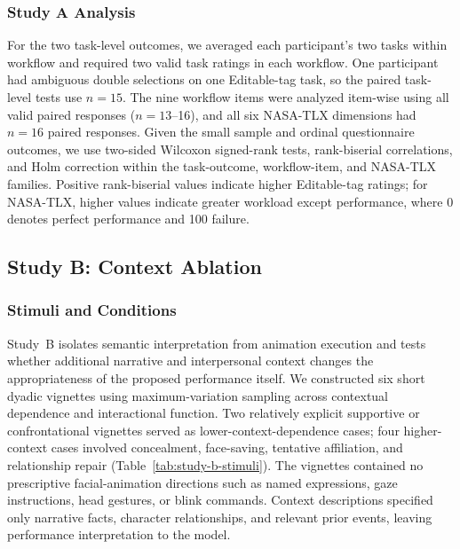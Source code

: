 \subsubsection{Study A Analysis}

For the two task-level outcomes, we averaged each participant's two tasks within workflow and required two valid task ratings in each workflow. One participant had ambiguous double selections on one Editable-tag task, so the paired task-level tests use $n=15$. The nine workflow items were analyzed item-wise using all valid paired responses ($n=13$--16), and all six NASA-TLX dimensions had $n=16$ paired responses. Given the small sample and ordinal questionnaire outcomes, we use two-sided Wilcoxon signed-rank tests, rank-biserial correlations, and Holm correction within the task-outcome, workflow-item, and NASA-TLX families. Positive rank-biserial values indicate higher Editable-tag ratings; for NASA-TLX, higher values indicate greater workload except performance, where 0 denotes perfect performance and 100 failure.

\subsection{Study B: Context Ablation}

\subsubsection{Stimuli and Conditions}

Study~B isolates semantic interpretation from animation execution and tests whether additional narrative and interpersonal context changes the appropriateness of the proposed performance itself. We constructed six short dyadic vignettes using maximum-variation sampling across contextual dependence and interactional function. Two relatively explicit supportive or confrontational vignettes served as lower-context-dependence cases; four higher-context cases involved concealment, face-saving, tentative affiliation, and relationship repair (Table~\ref{tab:study-b-stimuli}). The vignettes contained no prescriptive facial-animation directions such as named expressions, gaze instructions, head gestures, or blink commands. Context descriptions specified only narrative facts, character relationships, and relevant prior events, leaving performance interpretation to the model.

